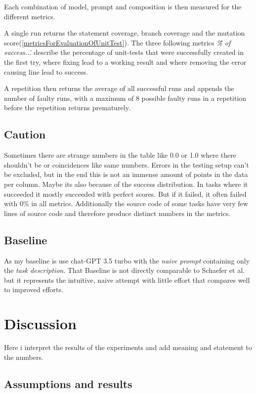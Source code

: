 \documentclass[a4paper,11pt,oneside]{memoir}
\begin{document}
Each combination of model, prompt and composition is then measured for the different metrics.

A single run returns the statement coverage, branch coverage and the mutation score(\ref{metricsForEvaluationOfUnitTest}). The three following metrics \textit{\"\% of success...\"} describe the percentage of unit-tests that were successfully created in the first try, where fixing lead to a working result and where removing the error causing line lead to success. 

A repetition then returns the average of all successful runs and appends the number of faulty runs, with a maximum of 8 possible faulty runs in a repetition before the repetition returns prematurely.

\section{Caution}
Sometimes there are strange numbers in the table like 0.0 or 1.0 where there shouldn't be or coincidences like same numbers. Errors in the testing setup can't be excluded, but in the end this is not an immense amount of points in the data per column. Maybe its also because of the success distribution. In tasks where it succeeded it mostly succeeded with perfect scores. But if it failed, it  often failed with 0\% in all metrics. Additionally the source code of some tasks have very few lines of source code and therefore produce distinct numbers in the metrics.

\section{Baseline}
As my baseline is use chat-GPT 3.5 turbo with the \textit{naive prompt} containing only the \textit{task description}. That Baseline is not directly comparable to Schaefer et al.\cite{Schaefer_automated_unit_test_generation} but it represents the intuitive, naive attempt with little effort that compares well to improved efforts. 

\chapter{Discussion}
Here i interpret the results of the experiments and add meaning and statement to the numbers.
\label{Discussion}
\section{Assumptions and results}
\end{document}
